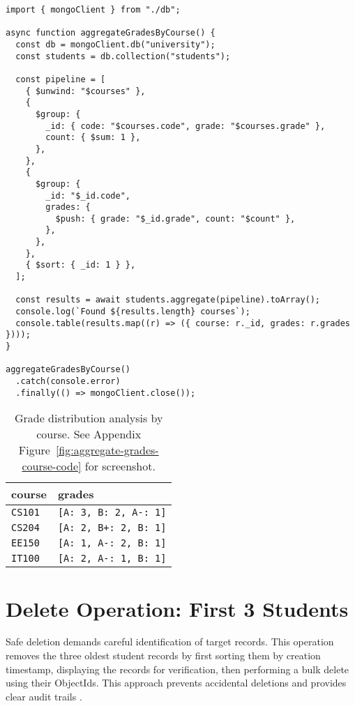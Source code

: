 \begin{verbatim}
import { mongoClient } from "./db";

async function aggregateGradesByCourse() {
  const db = mongoClient.db("university");
  const students = db.collection("students");

  const pipeline = [
    { $unwind: "$courses" },
    {
      $group: {
        _id: { code: "$courses.code", grade: "$courses.grade" },
        count: { $sum: 1 },
      },
    },
    {
      $group: {
        _id: "$_id.code",
        grades: {
          $push: { grade: "$_id.grade", count: "$count" },
        },
      },
    },
    { $sort: { _id: 1 } },
  ];

  const results = await students.aggregate(pipeline).toArray();
  console.log(`Found ${results.length} courses`);
  console.table(results.map((r) => ({ course: r._id, grades: r.grades })));
}

aggregateGradesByCourse()
  .catch(console.error)
  .finally(() => mongoClient.close());
\end{verbatim}

\begin{table}[H]
  \centering
  \begin{tabular}{|l|l|}
    \hline
    \textbf{course} & \textbf{grades} \\
    \hline
    \texttt{CS101} & \texttt{[A: 3, B: 2, A-: 1]} \\
    \texttt{CS204} & \texttt{[A: 2, B+: 2, B: 1]} \\
    \texttt{EE150} & \texttt{[A: 1, A-: 2, B: 1]} \\
    \texttt{IT100} & \texttt{[A: 2, A-: 1, B: 1]} \\
    \hline
  \end{tabular}
  \caption{Grade distribution analysis by course. See Appendix Figure~\ref{fig:aggregate-grades-course-code} for screenshot.}
\end{table}

\section{Delete Operation: First 3 Students}
Safe deletion demands careful identification of target records. This operation removes the three oldest student records by first sorting them by creation timestamp, displaying the records for verification, then performing a bulk delete using their ObjectIds. This approach prevents accidental deletions and provides clear audit trails \parencite{mongodb_definitive_guide}.

